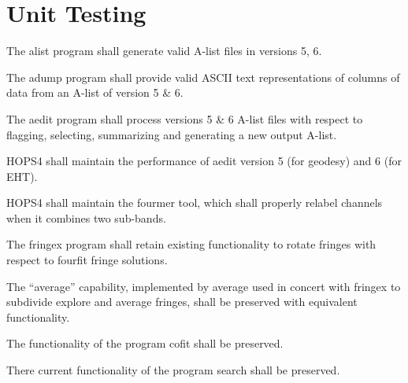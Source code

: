 %
%
\section{Unit Testing}
\label{sec:unit}


 The \acs{alist} program shall generate valid \acs{A-list} files in 
versions 5, 6. 

 The \acs{adump} program shall provide valid ASCII text representations 
of columns of data from an \acs{A-list} of version 5 \& 6.

 The \acs{aedit} program shall process versions 5 \& 6 \acs{A-list} 
files with respect to flagging, selecting, summarizing and generating a new 
output \acs{A-list}.

 HOPS4 shall maintain the performance of \acs{aedit} version 5 (for 
geodesy) and 6 (for EHT).

 HOPS4 shall maintain the \acs{fourmer} tool, which shall properly 
relabel channels when it combines two sub-bands.

 The \acs{fringex} program shall retain existing functionality to rotate
fringes with respect to fourfit fringe solutions.

 The ``average'' capability, implemented by \acs{average} used in 
concert with \acs{fringex} to subdivide explore and average fringes, shall be 
preserved with equivalent functionality.

 The functionality of the program \acs{cofit} shall be preserved.

 There current functionality of the program \acs{search} shall be 
preserved.

